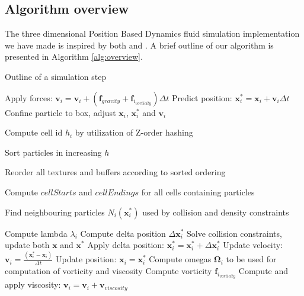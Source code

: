 \subsection{Algorithm overview}

The three dimensional Position Based Dynamics fluid simulation implementation we have made is inspired by both \cite{macklin2013position} and \cite{macklin2014unified}. A brief outline of our algorithm is presented in Algorithm \ref{alg:overview}.

\begin{algorithm}
\caption{Outline of a simulation step}
\label{alg:overview}
\begin{algorithmic}[1]
\small

\State Apply forces: $\mathbf{v}_{i} = \mathbf{v}_{i} + (\mathbf{f}_{gravity} + \mathbf{f}_{i_{vorticity}})\Delta t$
\State Predict position: $\mathbf{x}_{i}^{*}= \mathbf{x}_{i} + \mathbf{v}_{i} \Delta t$
\State Confine particle to box, adjust $\mathbf{x}_{i}$, $\mathbf{x}_{i}^{*}$ and $\mathbf{v}_{i}$ 
\EndFor


\State Compute cell id $h_{i}$ by utilization of Z-order hashing
\EndFor

\State Sort particles in increasing $h$

\State Reorder all textures and buffers according to sorted ordering

\State Compute $cellStarts$ and $cellEndings$ for all cells containing particles


\State Find neighbouring particles $N_{i}(\mathbf{x}_{i}^{*})$ used by collision and density constraints
\EndFor

\State Compute lambda $\lambda_{i}$
\EndFor
{}
\State Compute delta position $\Delta \mathbf{x}_{i}^{*}$
\EndFor
{}
\State Solve collision constraints, update both $\mathbf{x}$ and $\mathbf{x}^{*}$
\EndWhile
{}
\State Apply delta position: $\mathbf{x}_{i}^{*} = \mathbf{x}_{i}^{*} + \Delta \mathbf{x}_{i}^{*}$
\EndFor
\EndWhile
{}
\State Update velocity: $\mathbf{v}_{i} = \frac{(\mathbf{x}_{i}^{*} - \mathbf{x}_{i})}{\Delta t}$
\State Update position: $\mathbf{x}_{i} = \mathbf{x}_{i}^{*}$
\EndFor
{}
\State Compute omegas $\mathbf{\Omega}_{i}$ to be used for computation of vorticity and viscosity
\EndFor
{}
\State Compute vorticity $\mathbf{f}_{i_{vorticity}}$
\EndFor
{}
\State Compute and apply viscosity: $\mathbf{v}_{i} = \mathbf{v}_{i} + \mathbf{v}_{viscosity}$
\EndFor

\end{algorithmic}
\end{algorithm}


